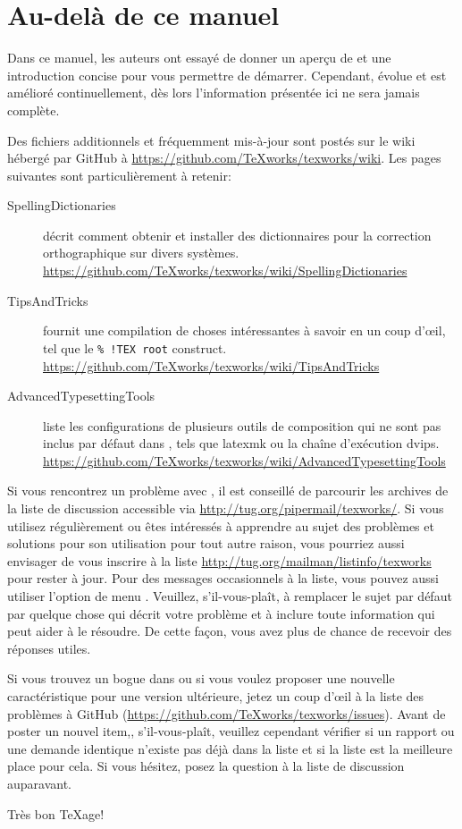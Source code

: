 
\chapter{Au-del{\`a} de ce manuel}

Dans ce manuel, les auteurs ont essayé de donner un aperçu de \Tw{} et une introduction concise pour vous permettre de démarrer. Cependant, \Tw{} évolue et est amélioré continuellement, dès lors l'information présentée ici ne sera jamais complète.

Des fichiers additionnels et fréquemment mis-à-jour sont postés sur le wiki hébergé par GitHub à \url{https://github.com/TeXworks/texworks/wiki}. Les pages suivantes sont particulièrement à retenir:
\begin{description}
\item[SpellingDictionaries] décrit comment obtenir et installer des dictionnaires pour la correction orthographique sur divers systèmes. \url{https://github.com/TeXworks/texworks/wiki/SpellingDictionaries}
\item[TipsAndTricks] fournit une compilation de choses intéressantes à savoir en un coup d'œil, tel que le \verb|% !TEX root| construct. \url{https://github.com/TeXworks/texworks/wiki/TipsAndTricks}
\item[AdvancedTypesettingTools] liste les configurations de plusieurs outils de composition qui ne sont pas inclus par défaut dans \Tw, tels que latexmk ou la chaîne d'exécution dvips. \url{https://github.com/TeXworks/texworks/wiki/AdvancedTypesettingTools}
\end{description}

Si vous rencontrez un problème avec \Tw, il est conseillé de parcourir les archives de la liste de discussion accessible via \url{http://tug.org/pipermail/texworks/}. Si vous utilisez \Tw{} régulièrement ou êtes intéressés à apprendre au sujet des problèmes et solutions pour son utilisation pour tout autre raison, vous pourriez aussi envisager de vous inscrire à la liste \url{http://tug.org/mailman/listinfo/texworks} pour rester à jour. Pour des messages occasionnels à la liste, vous pouvez aussi utiliser l'option de menu \submenu{}. Veuillez, s'il-vous-plaît, à remplacer le sujet par défaut par quelque chose qui décrit votre problème et à inclure toute information qui peut aider à le résoudre. De cette façon, vous avez plus de chance de recevoir des réponses utiles.

Si vous trouvez un bogue dans \Tw{} ou si vous voulez proposer une nouvelle caractéristique pour une version ultérieure, jetez un coup d'œil à la liste des problèmes à GitHub (\url{https://github.com/TeXworks/texworks/issues}). Avant de poster un nouvel item,, s'il-vous-plaît, veuillez cependant vérifier si un rapport ou une demande identique n'existe pas déjà dans la liste et si la liste est la meilleure place pour cela. Si vous hésitez, posez la question à la liste de discussion auparavant.

Très bon \TeX{}age!
